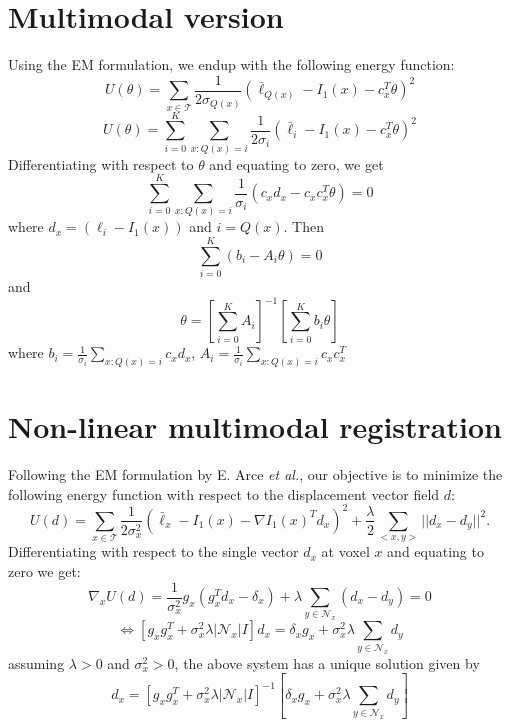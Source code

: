 \documentclass[11pt]{article}
\begin{document}
\section{Multimodal version}
Using the EM formulation, we endup with the following energy function:
\begin{equation}
	U(\theta) = \sum_{x\in \mathcal{T}} \frac{1}{2\sigma_{Q(x)}}(\bar{\ell}_{Q(x)} - I_{1}(x) - c_{x}^{T}\theta)^{2}
\end{equation}
\begin{equation}
	U(\theta) = \sum_{i=0}^{K}\sum_{x:Q(x)=i} \frac{1}{2\sigma_{i}}(\bar{\ell}_{i} - I_{1}(x) - c_{x}^{T}\theta)^{2}
\end{equation}
Differentiating with respect to $\theta$ and equating to zero, we get
\begin{equation}
	\sum_{i=0}^{K}\sum_{x:Q(x)=i}\frac{1}{\sigma_{i}}\left(c_{x}d_{x} - c_{x}c_{x}^{T}\theta\right)=0
\end{equation}
where $d_{x}=(\ell_{i} - I_{1}(x))$ and $i=Q(x)$. Then
\begin{equation}
	\sum_{i=0}^{K}\left(b_i - A_{i}\theta\right)=0
\end{equation}
and
\begin{equation}
	\theta=\left[\sum_{i=0}^{K}A_{i}\right]^{-1}\left[\sum_{i=0}^{K}b_i\theta\right]
\end{equation}
where $b_i = \frac{1}{\sigma_i}\sum_{x:Q(x)=i}c_{x}d_{x}$, $A_i = \frac{1}{\sigma_i}\sum_{x:Q(x)=i}c_{x}c_{x}^{T}$


\section{Non-linear multimodal registration}
Following the EM formulation by E. Arce {\it et al.}, our objective is to minimize the following energy function with respect to the displacement vector field $d$:
\begin{equation}
	U(d) = \sum_{x \in \mathcal{T}}\frac{1}{2\sigma_{x}^{2}}(\bar{\ell}_x - I_{1}(x) - \nabla I_{1}(x)^{T}d_x)^{2} + \frac{\lambda}{2}\sum_{<x,y>}||d_{x} - d_y||^{2}.
\end{equation}
Differentiating with respect to the single vector $d_{x}$ at voxel $x$ and equating to zero we get:
\begin{equation}
	\nabla_{x}U(d) = \frac{1}{\sigma_{x}^{2}}g_{x}(g_{x}^{T}d_{x} - \delta_{x}) + \lambda \sum_{y \in \mathcal{N}_x}(d_{x} - d_{y})=0
\end{equation}
\begin{equation}
	\Leftrightarrow \left[g_{x}g_{x}^{T} + \sigma_{x}^{2}\lambda|\mathcal{N}_x|I \right]d_{x} = \delta_{x}g_{x} + \sigma_{x}^{2}\lambda\sum_{y \in \mathcal{N}_x}d_{y}
\end{equation}
assuming $\lambda>0$ and $\sigma_{x}^{2}>0$, the above system has a unique solution given by
\begin{equation}
	d_{x} =\left[g_{x}g_{x}^{T} + \sigma_{x}^{2}\lambda|\mathcal{N}_x|I \right]^{-1}\left[\delta_{x}g_{x} + \sigma_{x}^{2}\lambda\sum_{y \in \mathcal{N}_x}d_{y}\right]
\end{equation}
\end{document}
